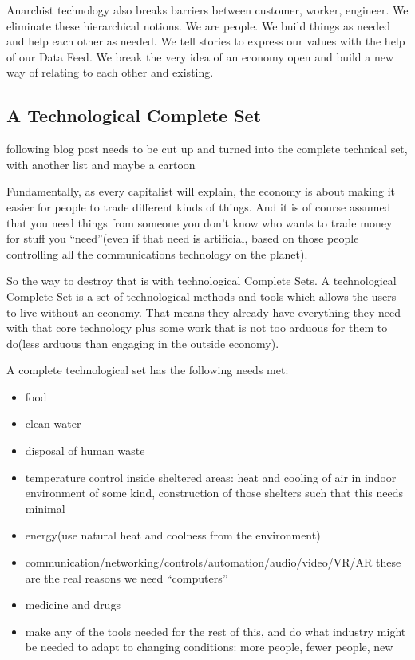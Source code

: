 Anarchist technology also breaks barriers between customer, worker,
engineer. We eliminate these hierarchical notions. We are people. We
build things as needed and help each other as needed. We tell stories to
express our values with the help of our Data Feed. We break the very
idea of an economy open and build a new way of relating to each other
and existing.

\subsection{A Technological Complete
Set}\label{a-technological-complete-set}

following blog post needs to be cut up and turned into the complete
technical set, with another list and maybe a cartoon

Fundamentally, as every capitalist will explain, the economy is about
making it easier for people to trade different kinds of things. And it
is of course assumed that you need things from someone you don't know
who wants to trade money for stuff you ``need''(even if that need is
artificial, based on those people controlling all the communications
technology on the planet).

So the way to destroy that is with technological Complete Sets. A
technological Complete Set is a set of technological methods and tools
which allows the users to live without an economy. That means they
already have everything they need with that core technology plus some
work that is not too arduous for them to do(less arduous than engaging
in the outside economy).

A complete technological set has the following needs met:

\begin{itemize}
\tightlist
\item
  food
\item
  clean water
\item
  disposal of human waste
\item
  temperature control inside sheltered areas: heat and cooling of air in
  indoor environment of some kind, construction of those shelters such
  that this needs minimal\\
\item
  energy(use natural heat and coolness from the environment)
\item
  communication/networking/controls/automation/audio/video/VR/AR these
  are the real reasons we need ``computers''
\item
  medicine and drugs
\item
  make any of the tools needed for the rest of this, and do what
  industry might be needed to adapt to changing conditions: more people,
  fewer people, new
\end{itemize}

